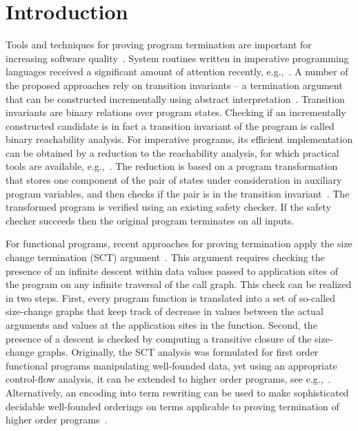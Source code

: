 \section{Introduction}

Tools and techniques for proving program termination are important for
increasing software quality~\cite{CACM}.
System routines written in imperative programming languages received a
significant amount of attention recently,
e.g.,~\cite{copytrick,Julia,KroeningCAV10,GieslBytecode,YangESOP08,SepLogTerm}. 
A number of the proposed approaches rely on transition invariants -- a
termination argument that can be constructed incrementally using
abstract interpretation~\cite{transitioninvariants}.
Transition invariants are binary relations over program states.
Checking if an incrementally constructed candidate is in fact a
transition invariant of the program is called binary reachability
analysis.
For imperative programs, its efficient implementation can be obtained
by a reduction to the reachability analysis, for which practical tools
are available, e.g.,~\cite{Slam,Blast,fsoft,Impact}.
The reduction is based on a program transformation that stores one
component of the pair of states under consideration in auxiliary program
variables, and then checks if the pair is in the transition
invariant~\cite{copytrick}. 
The transformed program is verified using an existing safety checker. 
If the safety checker succeeds then the original program terminates on all inputs.  

For functional programs, recent approaches for proving termination
apply the size change termination (SCT) argument~\cite{SCTPOPL2001}.
This argument requires checking the presence of an infinite descent within
data values passed to application sites of the program on any infinite
traversal of the call graph.
This check can be realized in two steps.
First, every program function is translated into a set of so-called
size-change graphs that keep track of decrease in values between the
actual arguments and values at the application sites in the
function.
Second, the presence of a descent is checked by computing a transitive
closure of the size-change graphs. 
Originally, the SCT analysis was formulated for first order functional
programs manipulating well-founded data, yet using an appropriate
control-flow analysis, it can be extended to higher order programs,
see
e.g.,~\cite{SereniICFP07,Sereni05terminationanalysis,SereniAPLAS05}.
Alternatively, an encoding into term rewriting can be used to make
sophisticated decidable well-founded orderings on terms applicable to proving
termination of higher order programs~\cite{GieslHaskell}.


